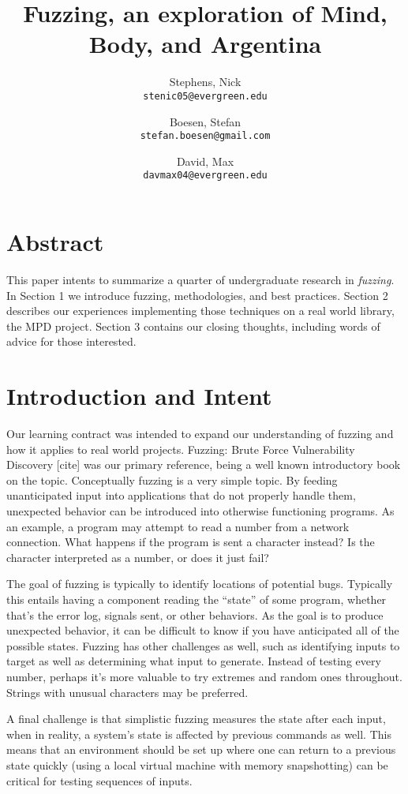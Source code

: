 \documentclass[10pt]{article}
\author{
  Stephens, Nick\\
  \texttt{stenic05@evergreen.edu}
  \and
  Boesen, Stefan\\
  \texttt{stefan.boesen@gmail.com}
  \and
  David, Max\\
  \texttt{davmax04@evergreen.edu}
}
\title{Fuzzing, an exploration of Mind, Body, and Argentina}
\begin{document}
  \maketitle

\section*{Abstract}
This paper intents to summarize a quarter of undergraduate research in \emph{fuzzing}. In Section 1 we introduce fuzzing, methodologies, and best practices. Section 2 describes our experiences implementing those techniques on a real world library, the MPD project. Section 3 contains our closing thoughts, including words of advice for those interested.

\section{Introduction and Intent}
Our learning contract was intended to expand our understanding of fuzzing and how it applies to real world projects. Fuzzing: Brute Force Vulnerability Discovery [cite] was our primary reference, being a well known introductory book on the topic. Conceptually fuzzing is a very simple topic. By feeding unanticipated input into applications that do not properly handle them, unexpected behavior can be introduced into otherwise functioning programs. As an example, a program may attempt to read a number from a network connection. What happens if the program is sent a character instead? Is the character interpreted as a number, or does it just fail? 

The goal of fuzzing is typically to identify locations of potential bugs. Typically this entails having a component reading the ``state'' of some program, whether that's the error log, signals sent, or other behaviors. As the goal is to produce unexpected behavior, it can be difficult to know if you have anticipated all of the possible states. Fuzzing has other challenges as well, such as identifying inputs to target as well as determining what input to generate. Instead of testing every number, perhaps it's more valuable to try extremes and random ones throughout. Strings with unusual characters may be preferred.

A final challenge is that simplistic fuzzing measures the state after each input, when in reality, a system's state is affected by previous commands as well. This means that an environment should be set up where one can return to a previous state quickly (using a local virtual machine with memory snapshotting) can be critical for testing sequences of inputs.
\end{document}
